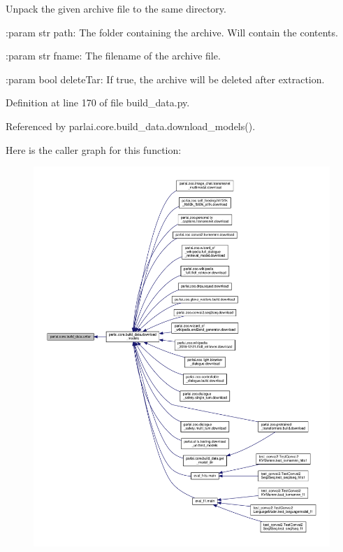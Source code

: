 \begin{DoxyVerb}Unpack the given archive file to the same directory.

:param str path:
    The folder containing the archive. Will contain the contents.

:param str fname:
    The filename of the archive file.

:param bool deleteTar:
    If true, the archive will be deleted after extraction.
\end{DoxyVerb}
 

Definition at line 170 of file build\+\_\+data.\+py.



Referenced by parlai.\+core.\+build\+\_\+data.\+download\+\_\+models().

Here is the caller graph for this function\+:
\nopagebreak
\begin{figure}[H]
\begin{center}
\leavevmode
\includegraphics[width=350pt]{namespaceparlai_1_1core_1_1build__data_a4d33f97932682a8513904022d852f3cf_icgraph}
\end{center}
\end{figure}
\mbox{\label{namespaceparlai_1_1core_1_1build__data_a7cbfdf246ca40dc3ed9f8613deb14a00}} 

